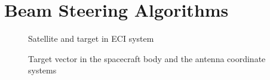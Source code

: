 \section{Beam Steering Algorithms}
\label{sec:beamsteering}

\begin{figure}[H]
    \centering
    \captionsetup{justification=centering,margin=2cm}
    
    \caption{Satellite and target in \acrshort{ECI} system}
    \label{fig:eci_cs}
\end{figure}
\begin{figure}[H]
    \centering
    \captionsetup{justification=centering,margin=2cm}
    
    \caption{Target vector in the  spacecraft body and the antenna coordinate systems}
    \label{fig:body_cs}
\end{figure}